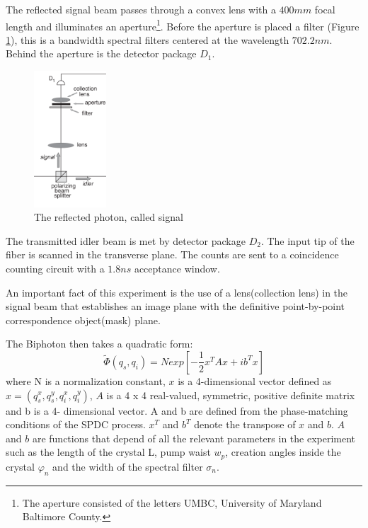The reflected signal beam passes through a 
convex lens with a $400mm$ focal length and illuminates an aperture\footnote{The aperture 
consisted of the letters UMBC, University of Maryland Baltimore County.}.
Before the aperture is placed a filter (Figure \ref{fig:signal}), 
this is a bandwidth spectral filters centered at the
wavelength $702.2 nm$. 
Behind the aperture is the detector package $D_1$. \\
\begin{figure}[H]
\centering
\includegraphics[width=0.24\textwidth]{Figures/signal.png}
\caption{The reflected photon, called signal} 
\label{fig:signal}
\end{figure}


The transmitted idler beam is met by detector 
package $D_2$. The input tip of the fiber is scanned in the transverse 
plane. The counts are sent to a coincidence 
counting circuit with a $1.8ns$ acceptance window.


An important fact of this experiment is the use of a lens(collection lens) in the signal beam that establishes 
an image plane with the definitive point-by-point correspondence object(mask) plane.





The Biphoton then takes a quadratic form:
\begin{equation}\label{eq:quadratic}
\tilde{\Phi}(q_s,q_i)=N exp\left[ -\frac{1}{2}x^T A x + i b^T x \right]
\end{equation}
where N is a normalization constant, $x$ is a 4-dimensional vector defined as $x = (q^x_s, q^y_s ,q^x_i,q^y_i )$, $A$ is a 4 x 4 real-valued, symmetric, positive definite matrix and b is a 4- dimensional vector. A and b are defined from the phase-matching conditions of the SPDC process. $x^T$ and $b^T$ denote the transpose of $x$ and $b$. $A$ and $b$ are functions that depend of all the relevant parameters in the experiment such as the length of the crystal L, pump waist $w_p$, creation angles inside the crystal $\varphi_n$ and the width of the spectral filter $\sigma_n$.

